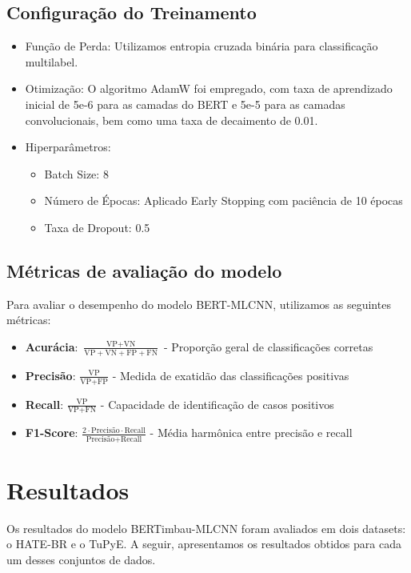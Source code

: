 \documentclass[sigconf,nonacm]{acmart}
\begin{document}
\subsection{Configuração do Treinamento}
\begin{itemize}
  \item Função de Perda: Utilizamos entropia cruzada binária para classificação multilabel.
  \item Otimização: O algoritmo AdamW foi empregado, com taxa de aprendizado inicial de 5e-6 para as camadas do BERT e 5e-5 para as camadas convolucionais, 
  bem como uma taxa de decaimento de 0.01.
  \item Hiperparâmetros:
  \begin{itemize}
    \item Batch Size: 8
    \item Número de Épocas: Aplicado Early Stopping com paciência de 10 épocas
    \item Taxa de Dropout: 0.5
  \end{itemize}
\end{itemize}

\subsection{Métricas de avaliação do modelo}
Para avaliar o desempenho do modelo BERT-MLCNN, utilizamos as seguintes métricas:

\begin{itemize}
  \item \textbf{Acurácia}: $\frac{\text{VP} + \text{VN}}{\text{VP} + \text{VN} + \text{FP} + \text{FN}}$ - Proporção geral de classificações corretas

  \item \textbf{Precisão}: $\frac{\text{VP}}{\text{VP} + \text{FP}}$ - Medida de exatidão das classificações positivas
    
  \item \textbf{Recall}: $\frac{\text{VP}}{\text{VP} + \text{FN}}$ - Capacidade de identificação de casos positivos
  
  \item \textbf{F1-Score}: $\frac{2 \cdot \text{Precisão} \cdot \text{Recall}}{\text{Precisão} + \text{Recall}}$ - Média harmônica entre precisão e recall

\end{itemize}

\section{Resultados}
Os resultados do modelo BERTimbau-MLCNN foram avaliados em dois datasets: o HATE-BR e o TuPyE. A seguir, 
apresentamos os resultados obtidos para cada um desses conjuntos de dados.
\end{document}
